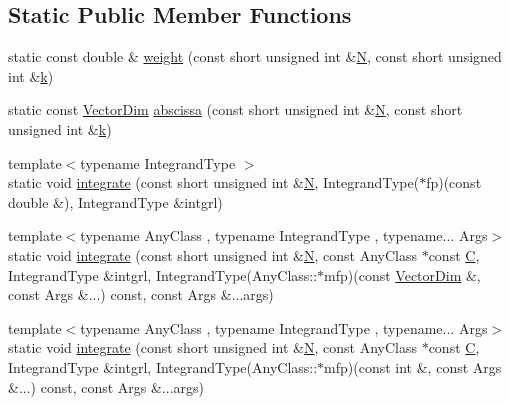 \subsection*{Static Public Member Functions}
\begin{DoxyCompactItemize}
\item 
static const double \& \hyperlink{structmodel_1_1_quadrature_dynamic_a1888dd66315ef67c82f588a50b9ee84d}{weight} (const short unsigned int \&\hyperlink{thompson__tetrahedron_8m_a7823765a845eb81829f110d8337f81ae}{N}, const short unsigned int \&\hyperlink{_f_e_m_2linear__elasticity__3d_2tetgen_2generate_p_o_l_ycube_8m_a5d2aad4440da75aa43f2643e72b1a3bd}{k})
\item 
static const \hyperlink{structmodel_1_1_quadrature_dynamic_a938d089d4cea5e1029076fbf5801521a}{Vector\+Dim} \hyperlink{structmodel_1_1_quadrature_dynamic_a71d85a669a8e3381678f8f4df9a4ca9c}{abscissa} (const short unsigned int \&\hyperlink{thompson__tetrahedron_8m_a7823765a845eb81829f110d8337f81ae}{N}, const short unsigned int \&\hyperlink{_f_e_m_2linear__elasticity__3d_2tetgen_2generate_p_o_l_ycube_8m_a5d2aad4440da75aa43f2643e72b1a3bd}{k})
\item 
{\footnotesize template$<$typename Integrand\+Type $>$ }\\static void \hyperlink{structmodel_1_1_quadrature_dynamic_a110468e25a599b2a864c07e401f6baa9}{integrate} (const short unsigned int \&\hyperlink{thompson__tetrahedron_8m_a7823765a845eb81829f110d8337f81ae}{N}, Integrand\+Type($\ast$fp)(const double \&), Integrand\+Type \&intgrl)
\item 
{\footnotesize template$<$typename Any\+Class , typename Integrand\+Type , typename... Args$>$ }\\static void \hyperlink{structmodel_1_1_quadrature_dynamic_aee903f409bdfb03a290dfb559c1870ff}{integrate} (const short unsigned int \&\hyperlink{thompson__tetrahedron_8m_a7823765a845eb81829f110d8337f81ae}{N}, const Any\+Class $\ast$const \hyperlink{plot_cells_8m_aaa53ca0b650dfd85c4f59fa156f7a2cc}{C}, Integrand\+Type \&intgrl, Integrand\+Type(Any\+Class\+::$\ast$mfp)(const \hyperlink{structmodel_1_1_quadrature_dynamic_a938d089d4cea5e1029076fbf5801521a}{Vector\+Dim} \&, const Args \&...) const, const Args \&...args)
\item 
{\footnotesize template$<$typename Any\+Class , typename Integrand\+Type , typename... Args$>$ }\\static void \hyperlink{structmodel_1_1_quadrature_dynamic_a7ee8c2230cbf2a9243702283fd26f2fe}{integrate} (const short unsigned int \&\hyperlink{thompson__tetrahedron_8m_a7823765a845eb81829f110d8337f81ae}{N}, const Any\+Class $\ast$const \hyperlink{plot_cells_8m_aaa53ca0b650dfd85c4f59fa156f7a2cc}{C}, Integrand\+Type \&intgrl, Integrand\+Type(Any\+Class\+::$\ast$mfp)(const int \&, const Args \&...) const, const Args \&...args)

\end{DoxyCompactItemize}
